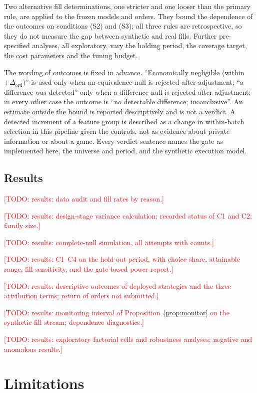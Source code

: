 \documentclass[11pt]{article}
\theoremstyle{remark}
\newcommand{\todo}[1]{\textcolor{red}{[TODO: #1]}}
\begin{document}
Two alternative fill determinations, one stricter and one looser than the primary rule, are
applied to the frozen models and orders. They bound the dependence of the outcomes on
conditions (S2) and (S3); all three rules are retrospective, so they do not measure the gap
between synthetic and real fills. Further pre-specified analyses, all exploratory, vary the
holding period, the coverage target, the cost parameters and the tuning budget.

The wording of outcomes is fixed in advance. ``Economically negligible (within
$\pm\Delta_{\mathrm{ord}}$)'' is used only when an equivalence null is rejected after
adjustment; ``a difference was detected'' only when a difference null is rejected after
adjustment; in every other case the outcome is ``no detectable difference; inconclusive''. An
estimate outside the bound is reported descriptively and is not a verdict. A detected increment
of a feature group is described as a change in within-batch selection in this pipeline given the
controls, not as evidence about private information or about a game. Every verdict sentence
names the gate as implemented here, the universe and period, and the synthetic execution model.

\subsection{Results}

\todo{results: data audit and fill rates by reason.}

\todo{results: design-stage variance calculation; recorded status of C1 and C2; family size.}

\todo{results: complete-null simulation, all attempts with counts.}

\todo{results: C1--C4 on the hold-out period, with choice share, attainable range, fill
sensitivity, and the gate-based power report.}

\todo{results: descriptive outcomes of deployed strategies and the three attribution terms;
return of orders not submitted.}

\todo{results: monitoring interval of Proposition~\ref{prop:monitor} on the synthetic fill
stream; dependence diagnostics.}

\todo{results: exploratory factorial cells and robustness analyses; negative and anomalous
results.}

\section{Limitations}
\label{sec:limitations}
\end{document}
